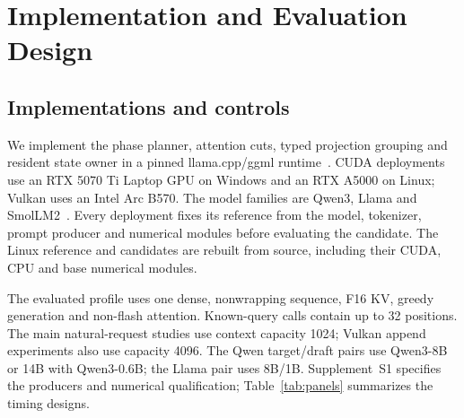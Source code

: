 \section{Implementation and Evaluation Design}
\label{sec:eval}
\subsection{Implementations and controls}
We implement the phase planner, attention cuts, typed projection grouping and resident state owner in a pinned llama.cpp/ggml runtime~\cite{records}. CUDA deployments use an RTX 5070 Ti Laptop GPU on Windows and an RTX A5000 on Linux; Vulkan uses an Intel Arc B570. The model families are Qwen3, Llama and SmolLM2~\cite{qwen3,llama3,smol}. Every deployment fixes its reference from the model, tokenizer, prompt producer and numerical modules before evaluating the candidate. The Linux reference and candidates are rebuilt from source, including their CUDA, CPU and base numerical modules.

The evaluated profile uses one dense, nonwrapping sequence, F16 KV, greedy generation and non-flash attention. Known-query calls contain up to 32 positions. The main natural-request studies use context capacity 1024; Vulkan append experiments also use capacity 4096. The Qwen target/draft pairs use Qwen3-8B or 14B with Qwen3-0.6B; the Llama pair uses 8B/1B. Supplement~S1 specifies the producers and numerical qualification; Table~\ref{tab:panels} summarizes the timing designs.

